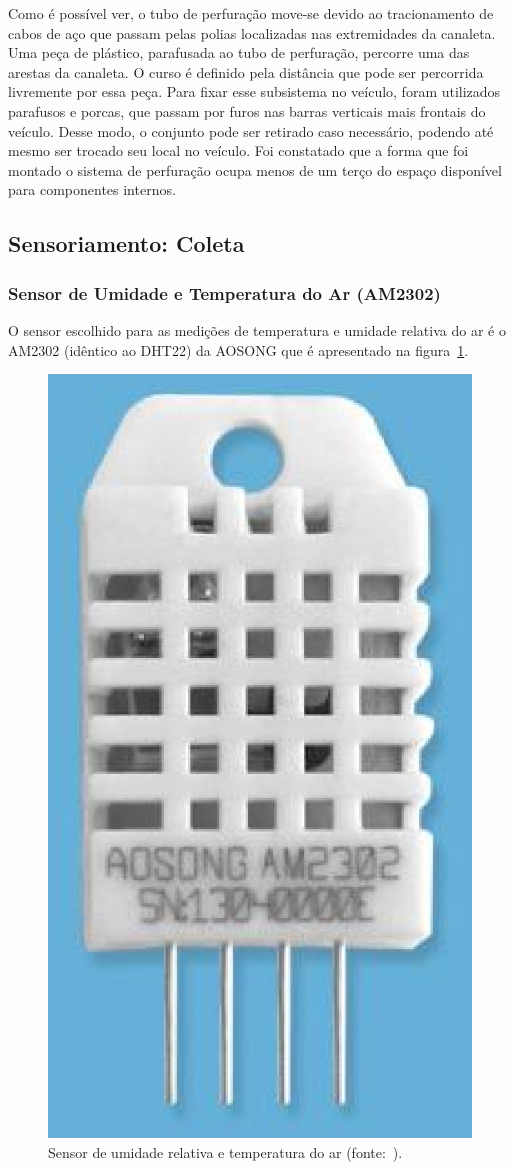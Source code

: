 	Como é possível ver, o tubo de perfuração move-se devido ao tracionamento de cabos de aço que passam pelas polias localizadas nas extremidades da canaleta. Uma peça de plástico, parafusada ao tubo de perfuração, percorre uma das arestas da canaleta. O curso é definido pela distância que pode ser percorrida livremente por essa peça. 
	Para fixar esse subsistema no veículo, foram utilizados parafusos e porcas, que passam por furos nas barras verticais mais frontais do veículo. Desse modo, o conjunto pode ser retirado caso necessário, podendo até mesmo ser trocado seu local no veículo. 
	Foi constatado que a forma que foi montado o sistema de perfuração ocupa menos de um terço do espaço disponível para componentes internos.
	
	
\subsection{Sensoriamento: Coleta}


	\subsubsection{Sensor de Umidade e Temperatura do Ar (AM2302)}

		O sensor escolhido para as medições de temperatura e umidade relativa do ar
		é o AM2302 (idêntico ao DHT22) da AOSONG que é apresentado na figura~\ref{fig:AM2302}. 

		\begin{figure}[!htbp]
		\begin{center}
		\includegraphics[width=.4\textwidth]{figuras/am2302.eps}
		\caption{\label{fig:AM2302}Sensor de umidade relativa e temperatura do ar (fonte:~).}
		\end{center}
		\end{figure}

